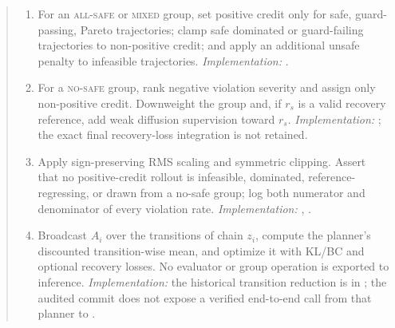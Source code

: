 \begin{quote}
\begin{enumerate}
  \item For an \textsc{all-safe} or \textsc{mixed} group, set positive credit
  only for safe, guard-passing, Pareto trajectories; clamp safe dominated or
  guard-failing trajectories to non-positive credit; and apply an additional
  unsafe penalty to infeasible trajectories.  \emph{Implementation:}
  .

  \item For a \textsc{no-safe} group, rank negative violation severity and
  assign only non-positive credit.  Downweight the group and, if $r_s$ is a
  valid recovery reference, add weak diffusion supervision toward $r_s$.
  \emph{Implementation:}
  ;
  the exact final recovery-loss integration is not retained.

  \item Apply sign-preserving RMS scaling and symmetric clipping.  Assert that
  no positive-credit rollout is infeasible, dominated, reference-regressing,
  or drawn from a no-safe group; log both numerator and denominator of every
  violation rate.  \emph{Implementation:}
  ,
  .

  \item Broadcast $A_i$ over the transitions of chain $z_i$, compute the
  planner's discounted transition-wise mean, and optimize it with KL/BC and
  optional recovery losses.  No evaluator or group operation is exported to
  inference.  \emph{Implementation:} the historical transition reduction is in
  ; the audited
  commit does not expose a verified end-to-end call from that planner to
  .
\end{enumerate}
\end{quote}

